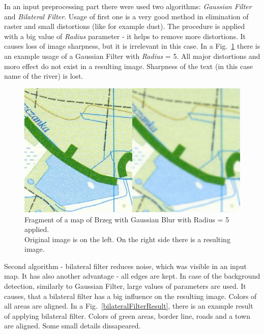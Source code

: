 \documentclass[a4paper,onecolumn,oneside,12pt]{memoir}
\begin{document}
In an input preprocessing part there were used two algorithms: \textit{Gaussian Filter} and \textit{
Bilateral Filter}. Usage of first one is a very good method in elimination of raster and small
distortions (like for example dust). The procedure is applied with a big value of \textit{Radius}
parameter - it helps to remove more distortions. It causes loss of image sharpness, but it is
irrelevant in this case. In a Fig.~\ref{gaussianBlurResult} there is an example usage of a Gaussian
Filter with \textit{Radius} = 5. All major distortions and moro effect do not exist in a resulting
image. Sharpness of the text (in this case name of the river) is lost.

\begin{figure}[!ht]
\begin{center}
\includegraphics[scale=3.0]{images/GaussianBlurResult.jpg}
\caption{Fragment of a map of Brzeg with Gaussian Blur with Radius = 5 applied. \\ 
Original image is on the left. On the right side there is a resulting image.}
\label{gaussianBlurResult}
\end{center}
\end{figure}

Second algorithm - bilateral filter reduces noise, which was visible in an input map. It has also
another advantage - all edges are kept. In case of the background detection, similarly to Gaussian
Filter, large values of parameters are used. It causes, that a bilateral filter has a big influence
on the resulting image. Colors of all areas are aligned. In a Fig.~\ref{bilateralFilterResult},
there is an example result of applying bilateral filter. Colors of green areas, border line, roads
and a town are aligned. Some small details dissapeared.
\end{document}
